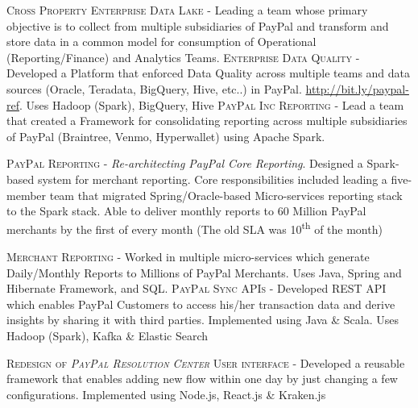 \documentclass[11pt, a4paper, sans]{moderncv}
\begin{document}
{\textsc{Cross Property Enterprise Data Lake} - Leading a team whose primary objective is to collect from multiple subsidiaries of PayPal and transform and store data in a common model for consumption of Operational (Reporting/Finance) and Analytics Teams. \newline} 
{\textsc{Enterprise Data Quality} - Developed a Platform that enforced Data Quality across multiple teams and data sources (Oracle, Teradata, BigQuery, Hive, etc..) in PayPal. \url{http://bit.ly/paypal-ref}. Uses Hadoop (Spark), BigQuery, Hive \newline} 
{\textsc{PayPal Inc Reporting} - Lead a team that created a Framework for consolidating reporting across multiple subsidiaries of PayPal (Braintree, Venmo, Hyperwallet) using Apache Spark. \newline} 

{\textsc{PayPal Reporting} - \textit{Re-architecting PayPal Core Reporting}.  Designed a Spark-based system for merchant reporting. Core responsibilities included leading a five-member team that migrated Spring/Oracle-based Micro-services reporting stack to the Spark stack. 
Able to deliver monthly reports to 60 Million PayPal merchants by the first of every month (The old SLA was 10\textsuperscript{th} of the month)  \newline} 

{\textsc{Merchant Reporting} - Worked in multiple micro-services which generate Daily/Monthly Reports to Millions of PayPal Merchants. Uses Java, Spring and Hibernate Framework, and SQL. \newline 
\newline \textsc{PayPal Sync APIs} - Developed REST API which enables PayPal Customers to access his/her transaction data and derive insights by sharing it with third parties. Implemented using Java \& Scala. Uses Hadoop (Spark), Kafka \& Elastic Search \newline} 

{\textsc{Redesign of \textit{PayPal Resolution Center} User interface} - Developed a reusable framework that enables adding new flow within one day by just changing a few configurations. Implemented using Node.js, React.js \& Kraken.js \newline} 
\end{document}
